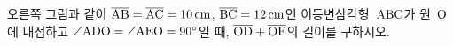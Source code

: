 \noindent\begin{minipage}[t]{0.58\linewidth}\vspace{0pt}\raggedright 오른쪽 그림과 같이 $\overline{\mathrm{AB}}=\overline{\mathrm{AC}}=10\,\mathrm{cm}$, $\overline{\mathrm{BC}}=12\,\mathrm{cm}$인 이등변삼각형~$\mathrm{ABC}$가 원~$\mathrm{O}$에 내접하고 $\angle\mathrm{ADO}=\angle\mathrm{AEO}=90^\circ$일 때, $\overline{\mathrm{OD}}+\overline{\mathrm{OE}}$의 길이를 구하시오.\end{minipage}\hfill\begin{minipage}[t]{0.4\linewidth}\vspace{0pt}\centering \resizebox{\ifdim\width>\linewidth\linewidth\else\width\fi}{!}{}\end{minipage}\par
